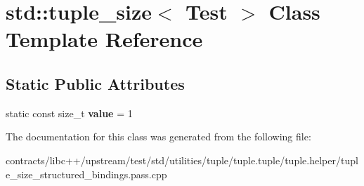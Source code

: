 \hypertarget{classstd_1_1tuple__size_3_01_test_01_4}{}\section{std\+:\+:tuple\+\_\+size$<$ Test $>$ Class Template Reference}
\label{classstd_1_1tuple__size_3_01_test_01_4}
\subsection*{Static Public Attributes}
\begin{DoxyCompactItemize}
\item 
\mbox{\label{classstd_1_1tuple__size_3_01_test_01_4_a68f267997d0a81c896d2272bf67fbbe0}} 
static const size\+\_\+t {\bfseries value} = 1
\end{DoxyCompactItemize}


The documentation for this class was generated from the following file\+:\begin{DoxyCompactItemize}
\item 
contracts/libc++/upstream/test/std/utilities/tuple/tuple.\+tuple/tuple.\+helper/tuple\+\_\+size\+\_\+structured\+\_\+bindings.\+pass.\+cpp\end{DoxyCompactItemize}
